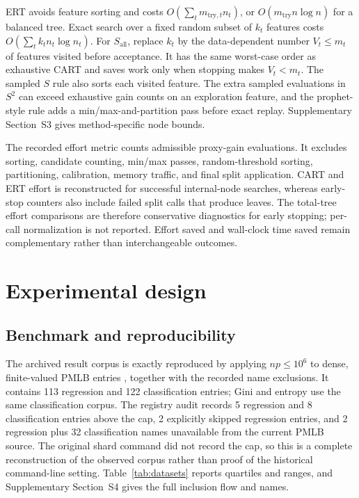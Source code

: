 \documentclass[final,5p,times,twocolumn]{elsarticle}
\begin{document}
ERT avoids feature sorting and costs \(O(\sum_t m_{\mathrm{try},t}n_t)\), or \(O(m_{\mathrm{try}}n\log n)\) for a balanced tree. Exact search over a fixed random subset of \(k_t\) features costs \(O(\sum_t k_t n_t\log n_t)\). For \(S_{\mathrm{all}}\), replace \(k_t\) by the data-dependent number \(V_t\leq m_t\) of features visited before acceptance. It has the same worst-case order as exhaustive CART and saves work only when stopping makes \(V_t<m_t\). The sampled \(S\) rule also sorts each visited feature. The extra sampled evaluations in \(S^2\) can exceed exhaustive gain counts on an exploration feature, and the prophet-style rule adds a min/max-and-partition pass before exact replay. Supplementary Section~S3 gives method-specific node bounds.

The recorded effort metric counts admissible proxy-gain evaluations. It excludes sorting, candidate counting, min/max passes, random-threshold sorting, partitioning, calibration, memory traffic, and final split application. CART and ERT effort is reconstructed for successful internal-node searches, whereas early-stop counters also include failed split calls that produce leaves. The total-tree effort comparisons are therefore conservative diagnostics for early stopping; per-call normalization is not reported. Effort saved and wall-clock time saved remain complementary rather than interchangeable outcomes.

\section{Experimental design}
\label{sec:experimental}

\subsection{Benchmark and reproducibility}

The archived result corpus is exactly reproduced by applying \(n p\leq10^6\) to dense, finite-valued PMLB entries \cite{romano2022pmlb}, together with the recorded name exclusions. It contains 113 regression and 122 classification entries; Gini and entropy use the same classification corpus. The registry audit records 5 regression and 8 classification entries above the cap, 2 explicitly skipped regression entries, and 2 regression plus 32 classification names unavailable from the current PMLB source. The original shard command did not record the cap, so this is a complete reconstruction of the observed corpus rather than proof of the historical command-line setting. Table~\ref{tab:datasets} reports quartiles and ranges, and Supplementary Section~S4 gives the full inclusion flow and names.
\end{document}
